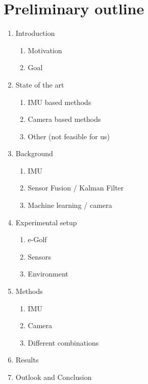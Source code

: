\documentclass{paper}
\begin{document}
\section{Preliminary outline}
\begin{enumerate}
    \item Introduction
        \begin{enumerate}
            \item Motivation
            \item Goal
        \end{enumerate}
    \item State of the art
        \begin{enumerate}
            \item IMU based methods
            \item Camera based methods
            \item Other (not feasible for us)
        \end{enumerate}
    \item Background
    \begin{enumerate}
        \item IMU
        \item Sensor Fusion / Kalman Filter
        \item Machine learning / camera
    \end{enumerate}
    \item Experimental setup
        \begin{enumerate}
            \item e-Golf
            \item Sensors
            \item Environment
        \end{enumerate}
    \item Methods
    \begin{enumerate}
        \item IMU
        \item Camera
        \item Different combinations
    \end{enumerate}
    \item Results
    \item Outlook and Conclusion
\end{enumerate}

\end{document}

